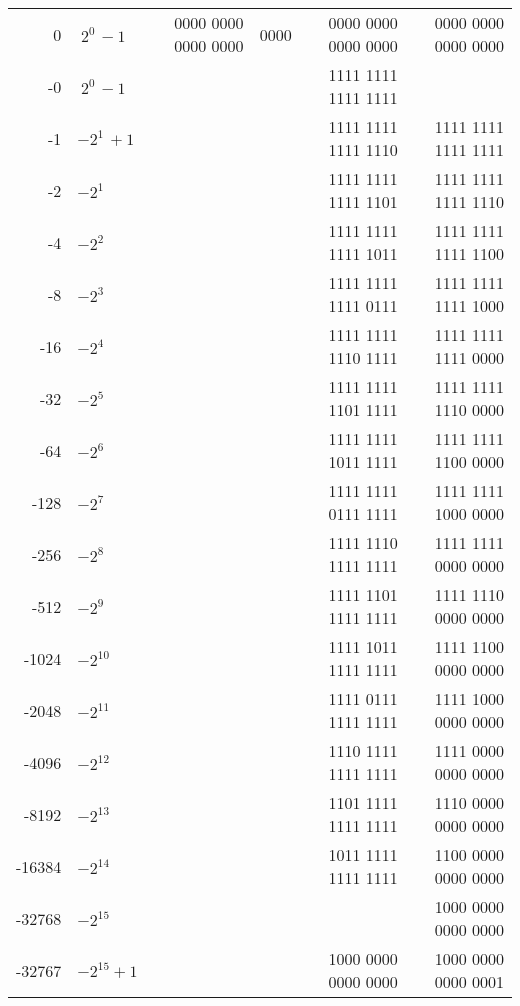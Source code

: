 \documentclass[a4paper,10pt]{article}
\begin{document}
\begin{center}
\begin{tabular}{rlrrrr}
        0 &$ ~2^{0~} - 1 $& 0000 0000 0000 0000 & 0000 & 0000 0000 0000 0000 & 0000 0000 0000 0000 \\
       -0 &$ ~2^{0~} - 1 $&                     &      & 1111 1111 1111 1111 &                     \\
       -1 &$ -2^{1~} + 1 $&                     &      & 1111 1111 1111 1110 & 1111 1111 1111 1111 \\
       -2 &$ -2^{1~}     $&                     &      & 1111 1111 1111 1101 & 1111 1111 1111 1110 \\
       -4 &$ -2^{2~}     $&                     &      & 1111 1111 1111 1011 & 1111 1111 1111 1100 \\
       -8 &$ -2^{3~}     $&                     &      & 1111 1111 1111 0111 & 1111 1111 1111 1000 \\
      -16 &$ -2^{4~}     $&                     &      & 1111 1111 1110 1111 & 1111 1111 1111 0000 \\
      -32 &$ -2^{5~}     $&                     &      & 1111 1111 1101 1111 & 1111 1111 1110 0000 \\
      -64 &$ -2^{6~}     $&                     &      & 1111 1111 1011 1111 & 1111 1111 1100 0000 \\
     -128 &$ -2^{7~}     $&                     &      & 1111 1111 0111 1111 & 1111 1111 1000 0000 \\
     -256 &$ -2^{8~}     $&                     &      & 1111 1110 1111 1111 & 1111 1111 0000 0000 \\
     -512 &$ -2^{9~}     $&                     &      & 1111 1101 1111 1111 & 1111 1110 0000 0000 \\
    -1024 &$ -2^{10}     $&                     &      & 1111 1011 1111 1111 & 1111 1100 0000 0000 \\
    -2048 &$ -2^{11}     $&                     &      & 1111 0111 1111 1111 & 1111 1000 0000 0000 \\
    -4096 &$ -2^{12}     $&                     &      & 1110 1111 1111 1111 & 1111 0000 0000 0000 \\
    -8192 &$ -2^{13}     $&                     &      & 1101 1111 1111 1111 & 1110 0000 0000 0000 \\
   -16384 &$ -2^{14}     $&                     &      & 1011 1111 1111 1111 & 1100 0000 0000 0000 \\
   -32768 &$ -2^{15}     $&                     &      &                     & 1000 0000 0000 0000 \\
    \midrule
   -32767 &$ -2^{15} + 1 $&                     &      & 1000 0000 0000 0000 & 1000 0000 0000 0001 \\

\end{tabular}
\end{center}
\end{document}
